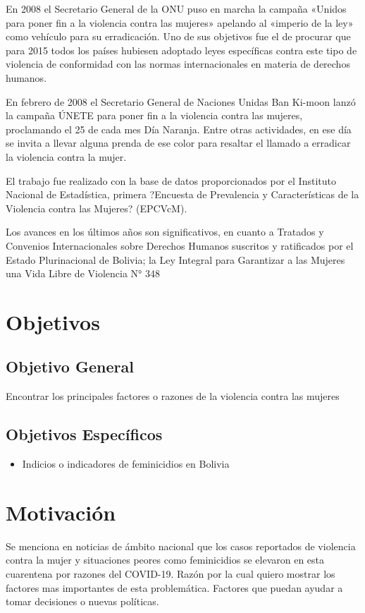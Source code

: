 En 2008 el Secretario General de la ONU puso en marcha la campaña «Unidos para poner fin a la violencia contra las mujeres» apelando al «imperio de la ley» como vehículo para su erradicación. Uno de sus objetivos fue el de procurar que para 2015 todos los países hubiesen adoptado leyes específicas contra este tipo de violencia de conformidad con las normas internacionales en materia de derechos humanos.

En febrero de 2008 el Secretario General de Naciones Unidas Ban Ki-moon lanzó la campaña ÚNETE para poner fin a la violencia contra las mujeres, proclamando el 25 de cada mes Día Naranja. Entre otras actividades, en ese día se invita a llevar alguna prenda de ese color para resaltar el llamado a erradicar la violencia contra la mujer.

El trabajo fue realizado con la base de datos proporcionados por el Instituto Nacional de Estadística, primera ?Encuesta de Prevalencia y Características de la Violencia contra las Mujeres? (EPCVcM).

Los avances en los últimos años son significativos, en cuanto a Tratados y Convenios Internacionales sobre Derechos Humanos suscritos y ratificados por el Estado Plurinacional de Bolivia; la Ley Integral para Garantizar a las Mujeres una Vida Libre de Violencia N° 348


\section{Objetivos}

\subsection{Objetivo General}
Encontrar los principales factores o razones de la violencia contra las mujeres
\subsection{Objetivos Específicos}
\begin{itemize}
\item Indicios o indicadores de feminicidios en Bolivia 
\end{itemize}

\section{Motivación}
Se menciona en noticias de ámbito nacional que los casos reportados de violencia contra la mujer y situaciones peores como feminicidios se elevaron en esta cuarentena por razones del COVID-19. 
Razón por la cual quiero mostrar los factores mas importantes de esta problemática.
Factores que puedan ayudar a tomar decisiones o nuevas políticas.

